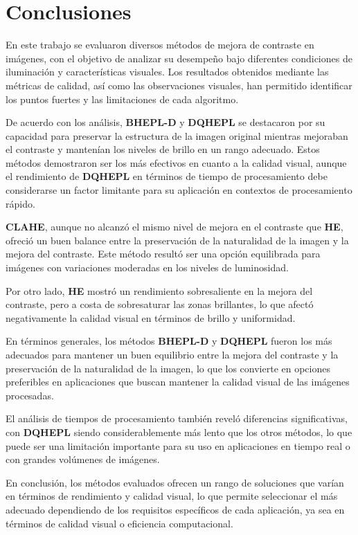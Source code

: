 \documentclass[sigchi]{acmart}
\begin{document}
\section{Conclusiones}
\label{sec:conclusiones}

En este trabajo se evaluaron diversos métodos de mejora de contraste en imágenes, con el
objetivo de analizar su desempeño bajo diferentes condiciones de iluminación y características
visuales. Los resultados obtenidos mediante las métricas de calidad, así como las observaciones
visuales, han permitido identificar los puntos fuertes y las limitaciones de cada algoritmo.

De acuerdo con los análisis, \textbf{BHEPL-D} y \textbf{DQHEPL} se destacaron por su capacidad
para preservar la estructura de la imagen original mientras mejoraban el contraste y mantenían
los niveles de brillo en un rango adecuado. Estos métodos demostraron ser los más efectivos en
cuanto a la calidad visual, aunque el rendimiento de \textbf{DQHEPL} en términos de tiempo de
procesamiento debe considerarse un factor limitante para su aplicación en contextos de
procesamiento rápido.

\textbf{CLAHE}, aunque no alcanzó el mismo nivel de mejora en el contraste que \textbf{HE},
ofreció un buen balance entre la preservación de la naturalidad de la imagen y la mejora del
contraste. Este método resultó ser una opción equilibrada para imágenes con variaciones
moderadas en los niveles de luminosidad.

Por otro lado, \textbf{HE} mostró un rendimiento sobresaliente en la mejora del contraste, pero
a costa de sobresaturar las zonas brillantes, lo que afectó negativamente la calidad visual en
términos de brillo y uniformidad.

En términos generales, los métodos \textbf{BHEPL-D} y \textbf{DQHEPL} fueron los más adecuados
para mantener un buen equilibrio entre la mejora del contraste y la preservación de la
naturalidad de la imagen, lo que los convierte en opciones preferibles en aplicaciones que
buscan mantener la calidad visual de las imágenes procesadas.

El análisis de tiempos de procesamiento también reveló diferencias significativas, con
\textbf{DQHEPL} siendo considerablemente más lento que los otros métodos, lo que puede ser una
limitación importante para su uso en aplicaciones en tiempo real o con grandes volúmenes de
imágenes.

En conclusión, los métodos evaluados ofrecen un rango de soluciones que varían en términos de
rendimiento y calidad visual, lo que permite seleccionar el más adecuado dependiendo de los
requisitos específicos de cada aplicación, ya sea en términos de calidad visual o eficiencia
computacional.
\end{document}
